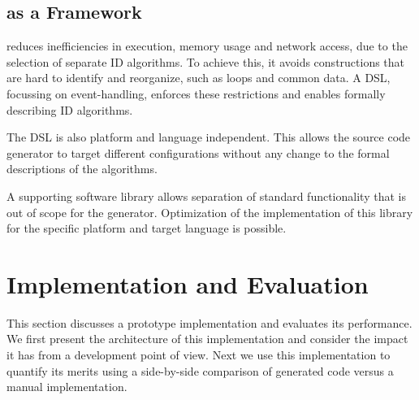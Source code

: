 \documentclass[conference]{IEEEtran}
\begin{document}
\subsection{\NAME as a Framework}

\NAME reduces inefficiencies in execution, memory usage and network access, due
to the selection of separate ID algorithms. To achieve this, it avoids
constructions that are hard to identify and reorganize, such as loops and
common data. A DSL, focussing on event-handling, enforces these restrictions
and enables formally describing ID algorithms.

The DSL is also platform and language independent. This allows the source code
generator to target different configurations without any change to the formal
descriptions of the algorithms.

A supporting software library allows separation of standard functionality that
is out of scope for the generator. Optimization of the implementation of this
library for the specific platform and target language is possible.

\section{Implementation and Evaluation}
\label{evaluation}

This section discusses a prototype implementation and evaluates its
performance. We first present the architecture of this implementation and
consider the impact it has from a development point of view. Next we use this
implementation to quantify its merits using a side-by-side comparison of
generated code versus a manual implementation.
\end{document}
